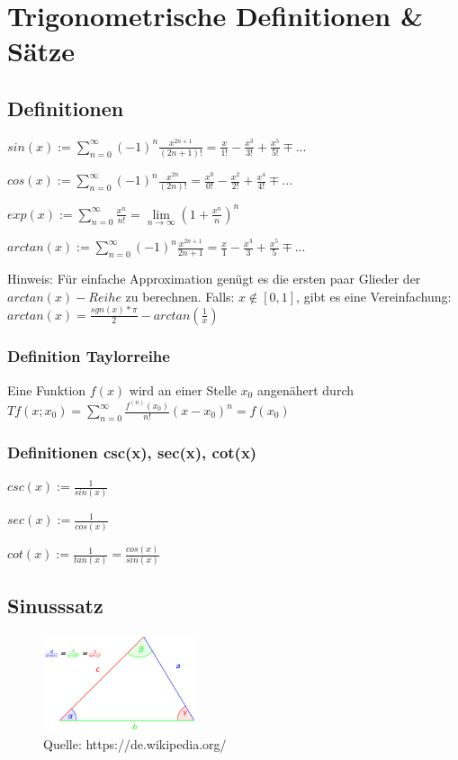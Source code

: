 
\section{Trigonometrische Definitionen \& Sätze}
\subsection{Definitionen}

$sin(x) := \sum_{n=0}^{\infty} (-1)^n \frac{x^{2n+1}}{(2n+1)!} = \frac{x}{1!} - \frac{x^3}{3!} + \frac{x^5}{5!} \mp ...$

$cos(x) := \sum_{n=0}^{\infty} (-1)^n \frac{x^{2n}}{(2n)!} = \frac{x^0}{0!} - \frac{x^2}{2!} + \frac{x^4}{4!} \mp ...$

$exp(x) := \sum_{n=0}^{\infty} \frac{x^{n}}{n!} = \lim\limits_{n \rightarrow \infty}{(1 + \frac{x^{n}}{n})^n}$

$arctan(x) := \sum_{n=0}^{\infty} (-1)^n \frac{x^{2n+1}}{2n+1} = \frac{x}{1} - \frac{x^3}{3} + \frac{x^5}{5} \mp ...$

Hinweis: Für einfache Approximation genügt es die ersten paar Glieder der $arctan(x)-Reihe$ zu berechnen. \newline 
Falls: $x \notin [0,1]$, gibt es eine Vereinfachung:
$ arctan(x) = \frac{sgn(x) * \pi}{2} - arctan(\frac{1}{x}) $

\subsubsection{Definition Taylorreihe} Eine Funktion $f(x)$ wird an einer Stelle $x_0$ angenähert durch $Tf(x;x_0) = \sum_{n=0}^{\infty} \frac{f^{(n)}(x_0)}{n!}(x - x_0)^n = f(x_0)$ \\

\subsubsection{Definitionen csc(x), sec(x), cot(x)}
$csc(x) := \frac{1}{sin(x)}$

$sec(x) := \frac{1}{cos(x)}$

$cot(x) := \frac{1}{tan(x)} = \frac{cos(x)}{sin(x)}$

\subsection{Sinusssatz}
\begin{figure}[h!]
\centering
    \includegraphics[width=0.4\textwidth]{images/sinussatz.png}
    \caption{Quelle: https://de.wikipedia.org/}
    
\end{figure}
